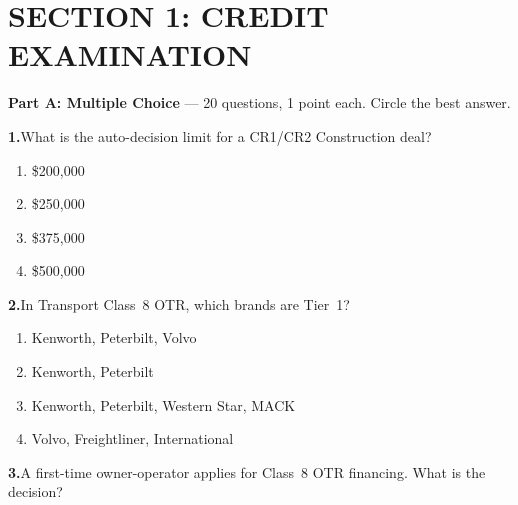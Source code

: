 \documentclass[11pt,letterpaper]{article}
\newif\ifshowsolutions
\newcommand{\answer}[1]{%
  \ifshowsolutions
    \begin{tcolorbox}[colback=green!5!white, colframe=answergreen, title={\small\textbf{Answer}}, fonttitle=\color{white}, coltitle=white, colbacktitle=answergreen, boxrule=0.5pt, arc=2pt, left=4pt, right=4pt, top=2pt, bottom=2pt]
    {\small #1}
    \end{tcolorbox}
  \fi
}
\begin{document}
\newpage

\section*{\color{mhcblue} SECTION 1: CREDIT EXAMINATION}

\begin{tcolorbox}[colback=blue!3!white, colframe=mhcblue, boxrule=0.5pt, arc=2pt]
\textbf{Part A: Multiple Choice} --- 20 questions, 1 point each. Circle the best answer.
\end{tcolorbox}

\vspace{0.5em}


\noindent\textbf{1.}\quad What is the auto-decision limit for a CR1/CR2 Construction deal?

\begin{enumerate}[label=\Alph*), leftmargin=2em, itemsep=0pt]
\item \$200,000
\item \$250,000
\item \$375,000
\item \$500,000
\end{enumerate}
\answer{C) \$375,000. CR3 = \$200K, CR4 = \$0.}

\vspace{0.5em}

\noindent\textbf{2.}\quad In Transport Class~8 OTR, which brands are Tier~1?

\begin{enumerate}[label=\Alph*), leftmargin=2em, itemsep=0pt]
\item Kenworth, Peterbilt, Volvo
\item Kenworth, Peterbilt
\item Kenworth, Peterbilt, Western Star, MACK
\item Volvo, Freightliner, International
\end{enumerate}
\answer{B) Kenworth and Peterbilt ONLY. Volvo is Tier~3 in Class~8 (but Tier~1 in Construction).}

\vspace{0.5em}

\noindent\textbf{3.}\quad A first-time owner-operator applies for Class~8 OTR financing. What is the decision?
\end{document}
